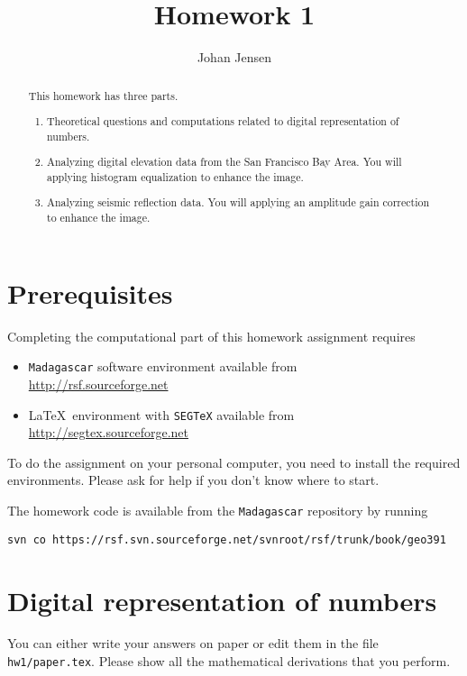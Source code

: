 \author{Johan Jensen}
\title{Homework 1}

\begin{abstract}
  This homework has three parts. 
  \begin{enumerate}
  \item Theoretical questions and computations related to digital representation of numbers.
  \item Analyzing digital elevation data from the San Francisco Bay Area. You will applying histogram equalization to enhance the image.
  \item Analyzing seismic reflection data. You will applying an amplitude gain correction to enhance the image.
  \end{enumerate}
\end{abstract}

\section{Prerequisites}

Completing the computational part of this homework assignment requires
\begin{itemize}
\item \texttt{Madagascar} software environment available from \\
\url{http://rsf.sourceforge.net}
\item \LaTeX\ environment with \texttt{SEGTeX} available from \\ 
\url{http://segtex.sourceforge.net}
\end{itemize}
To do the assignment on your personal computer, you need to install
the required environments. Please ask for help if you don't know where
to start.

The homework code is available from the \texttt{Madagascar} repository
by running
\begin{verbatim}
svn co https://rsf.svn.sourceforge.net/svnroot/rsf/trunk/book/geo391
\end{verbatim}

\newpage

\section{Digital representation of numbers}

You can either write your answers on paper or edit them in the file
\verb#hw1/paper.tex#. Please show all the mathematical
derivations that you perform.

